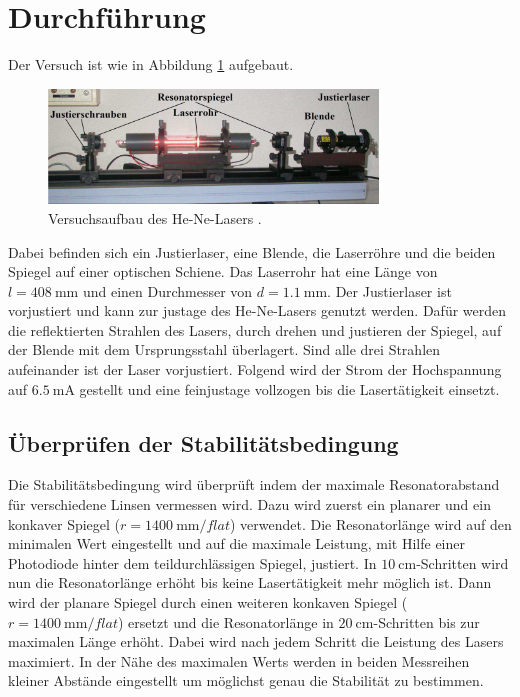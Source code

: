 \section{Durchführung}
\label{sec:Durchführung}
Der Versuch ist wie in Abbildung \ref{pic:aufbau} aufgebaut.
\begin{figure}
    \centering
    \includegraphics[width = 0.78\textwidth]{pics/Laseraufbau.png}
    \caption{Versuchsaufbau des He-Ne-Lasers \cite{V61}.}
    \label{pic:aufbau}
\end{figure}
Dabei befinden sich ein Justierlaser, eine Blende, die Laserröhre und die beiden Spiegel auf einer
optischen Schiene. Das Laserrohr hat eine Länge von $l = \SI{408}{\milli\meter}$ und einen Durchmesser von $d = \SI{1.1}{\milli\meter}$.
Der Justierlaser ist vorjustiert und kann zur justage
des He-Ne-Lasers genutzt werden. Dafür werden die reflektierten Strahlen des Lasers, durch drehen und justieren der Spiegel,
auf der Blende mit dem Ursprungsstahl überlagert. Sind alle drei Strahlen aufeinander ist der Laser vorjustiert.
Folgend wird der Strom der Hochspannung auf $\SI{6.5}{\milli\ampere}$ gestellt und eine
feinjustage vollzogen bis die Lasertätigkeit einsetzt.

\subsection{Überprüfen der Stabilitätsbedingung}
Die Stabilitätsbedingung wird überprüft indem der maximale Resonatorabstand
für verschiedene Linsen vermessen wird.
Dazu wird zuerst ein planarer und ein konkaver Spiegel ($r = \SI{1400}{\milli\meter\per flat}$) verwendet.
Die Resonatorlänge wird auf den minimalen Wert eingestellt und auf die maximale Leistung, mit Hilfe einer Photodiode hinter dem teildurchlässigen Spiegel, justiert.
In $\SI{10}{\centi\meter}$-Schritten wird nun die Resonatorlänge erhöht bis keine Lasertätigkeit mehr möglich ist.
Dann wird der planare Spiegel durch einen weiteren konkaven Spiegel ($r = \SI{1400}{\milli\meter\per flat}$)
ersetzt und die Resonatorlänge in $\SI{20}{\centi\meter}$-Schritten bis zur maximalen Länge erhöht.
Dabei wird nach jedem Schritt die Leistung des Lasers maximiert.
In der Nähe des maximalen Werts werden in beiden Messreihen kleiner Abstände eingestellt um möglichst genau die 
Stabilität zu bestimmen.

